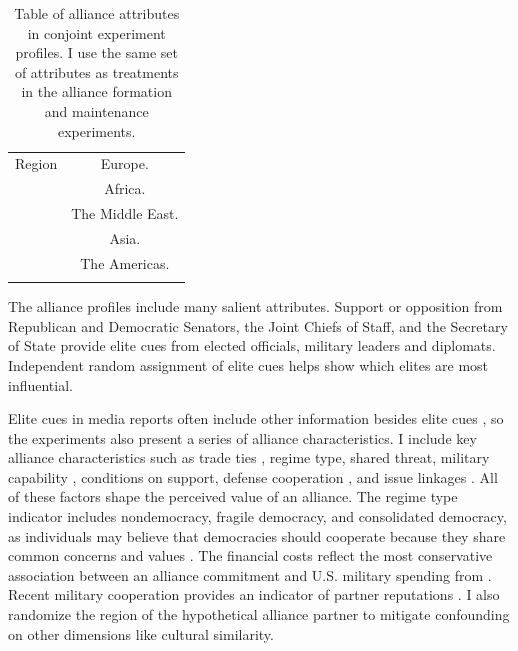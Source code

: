 \documentclass[12pt]{article}
\begin{document}
\begin{table}
\begin{adjustbox}{width = .99\textwidth}
\begin{tabular}{lc}
Region              & Europe. \\ 
                    & Africa. \\
                    & The Middle East. \\ 
                    & Asia. \\   
                    & The Americas. \\ 
                                                                            
\hline \\
\end{tabular}
\end{adjustbox}
\caption{Table of alliance attributes in conjoint experiment profiles. I use the same set of attributes as treatments in the alliance formation and maintenance experiments.} 
\label{tab:conjoint-vars}
\end{table}


The alliance profiles include many salient attributes.
Support or opposition from Republican and Democratic Senators, the Joint Chiefs of Staff, and the Secretary of State provide elite cues from elected officials, military leaders and diplomats. 
Independent random assignment of elite cues helps show which elites are most influential.


Elite cues in media reports often include other information besides elite cues \citep{BaumPotter2008}, so the experiments also present a series of alliance characteristics. 
I include key alliance characteristics such as trade ties \citep{Fordham2010}, regime type, shared threat, military capability \citep{Johnsonetal2015}, conditions on support, defense cooperation \citep{Morrow1994, LeedsAnac2005}, and issue linkages \citep{Poast2012}.
All of these factors shape the perceived value of an alliance. 
The regime type indicator includes nondemocracy, fragile democracy, and consolidated democracy, as individuals may believe that democracies should cooperate because they share common concerns and values \citep{Chuetal2021}. 
The financial costs reflect the most conservative association between an alliance commitment and U.S. military spending from \citet{AlleyFuhrmann2021}. 
Recent military cooperation provides an indicator of partner reputations \citep{Crescenzietal2012, GannonKent2020}.
I also randomize the region of the hypothetical alliance partner to mitigate confounding on other dimensions like cultural similarity.
\end{document}
